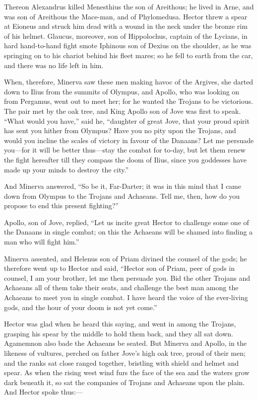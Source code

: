 Thereon Alexandrus killed Menesthius the son of Areithous; he lived in
Arne, and was son of Areithous the Mace-man, and of Phylomedusa. Hector
threw a spear at Eioneus and struck him dead with a wound in the neck
under the bronze rim of his helmet. Glaucus, moreover, son of Hippolochus,
captain of the Lycians, in hard hand-to-hand fight smote Iphinous son of
Dexius on the shoulder, as he was springing on to his chariot behind his
fleet mares; so he fell to earth from the car, and there was no life left
in him.

When, therefore, Minerva saw these men making havoc of the Argives, she
darted down to Ilius from the summits of Olympus, and Apollo, who was
looking on from Pergamus, went out to meet her; for he wanted the Trojans
to be victorious. The pair met by the oak tree, and King Apollo son of
Jove was first to speak. “What would you have,” said he, “daughter of
great Jove, that your proud spirit has sent you hither from Olympus? Have
you no pity upon the Trojans, and would you incline the scales of victory
in favour of the Danaans? Let me persuade you—for it will be better
thus—stay the combat for to-day, but let them renew the fight
hereafter till they compass the doom of Ilius, since you goddesses have
made up your minds to destroy the city.”

And Minerva answered, “So be it, Far-Darter; it was in this mind that I
came down from Olympus to the Trojans and Achaeans. Tell me, then, how do
you propose to end this present fighting?”

Apollo, son of Jove, replied, “Let us incite great Hector to challenge
some one of the Danaans in single combat; on this the Achaeans will be
shamed into finding a man who will fight him.”

Minerva assented, and Helenus son of Priam divined the counsel of the
gods; he therefore went up to Hector and said, “Hector son of Priam, peer
of gods in counsel, I am your brother, let me then persuade you. Bid the
other Trojans and Achaeans all of them take their seats, and challenge the
best man among the Achaeans to meet you in single combat. I have heard the
voice of the ever-living gods, and the hour of your doom is not yet come.”

Hector was glad when he heard this saying, and went in among the Trojans,
grasping his spear by the middle to hold them back, and they all sat down.
Agamemnon also bade the Achaeans be seated. But Minerva and Apollo, in the
likeness of vultures, perched on father Jove’s high oak tree, proud of
their men; and the ranks sat close ranged together, bristling with shield
and helmet and spear. As when the rising west wind furs the face of the
sea and the waters grow dark beneath it, so sat the companies of Trojans
and Achaeans upon the plain. And Hector spoke thus:—

